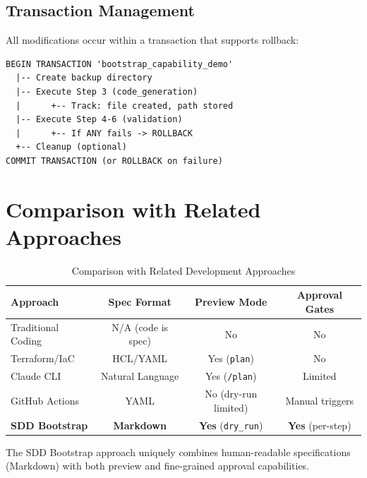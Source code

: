 \documentclass[11pt,letterpaper]{article}
\begin{document}
\subsection{Transaction Management}

All modifications occur within a transaction that supports rollback:

\begin{lstlisting}[caption={Transaction Flow}]
BEGIN TRANSACTION 'bootstrap_capability_demo'
  |-- Create backup directory
  |-- Execute Step 3 (code_generation)
  |      +-- Track: file created, path stored
  |-- Execute Step 4-6 (validation)
  |      +-- If ANY fails -> ROLLBACK
  +-- Cleanup (optional)
COMMIT TRANSACTION (or ROLLBACK on failure)
\end{lstlisting}

\section{Comparison with Related Approaches}

\begin{table}[h]
\centering
\caption{Comparison with Related Development Approaches}
\label{tab:comparison}
\begin{tabular}{@{}lccc@{}}
\toprule
\textbf{Approach} & \textbf{Spec Format} & \textbf{Preview Mode} & \textbf{Approval Gates} \\
\midrule
Traditional Coding    & N/A (code is spec) & No  & No  \\
Terraform/IaC         & HCL/YAML           & Yes (\texttt{plan}) & No  \\
Claude CLI            & Natural Language   & Yes (\texttt{/plan}) & Limited \\
GitHub Actions        & YAML               & No (dry-run limited) & Manual triggers \\
\textbf{SDD Bootstrap} & \textbf{Markdown} & \textbf{Yes} (\texttt{dry\_run}) & \textbf{Yes} (per-step) \\
\bottomrule
\end{tabular}
\end{table}

The SDD Bootstrap approach uniquely combines human-readable specifications (Markdown) with both preview and fine-grained approval capabilities.

\end{document}
